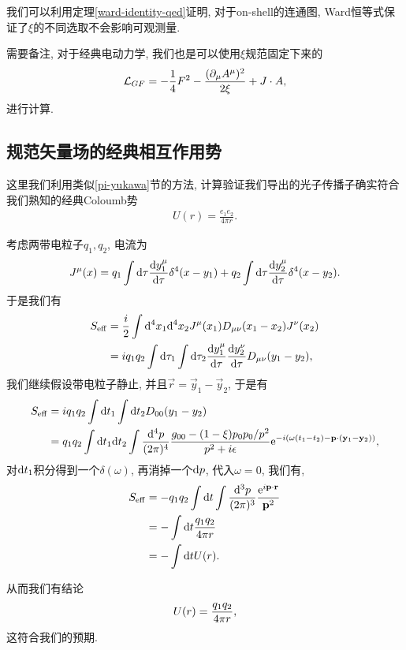 我们可以利用定理\ref{ward-identity-qed}证明, 对于on-shell的连通图, Ward恒等式保证了$\xi$的不同选取不会影响可观测量.

需要备注, 对于经典电动力学, 我们也是可以使用$\xi$规范固定下来的
\begin{align}
    \mathcal L_{GF}=-\frac14 F^2-\frac{(\partial_\mu A^\mu)^2}{2\xi}+J\cdot A\notag,
\end{align}
进行计算.

\subsection{规范矢量场的经典相互作用势}
这里我们利用类似\ref{pi-yukawa}节的方法, 计算验证我们导出的光子传播子确实符合我们熟知的经典Coloumb势
\begin{align}
    U(r)=\frac{e_1e_2}{4\pi r}.
\end{align}

考虑两带电粒子$q_1, q_2$, 电流为
\begin{align}
    J^\mu(x)=q_1\int\mathrm d\tau\frac{\mathrm dy_1^\mu}{\mathrm d\tau}\delta^4(x-y_1)+q_2\int\mathrm d\tau\frac{\mathrm dy_2^\mu}{\mathrm d\tau}\delta^4(x-y_2).
\end{align}
于是我们有
\begin{align}
    S_{\mathrm{eff}}&=\frac i2\int\mathrm d^4x_1\mathrm d^4x_2J^\mu(x_1)D_{\mu\nu}(x_1-x_2)J^\nu(x_2)\\
    &=iq_1q_2\int\mathrm d\tau_1\int\mathrm d\tau_2\frac{\mathrm dy_1^\mu}{\mathrm d\tau}\frac{\mathrm dy_2^\nu}{\mathrm d\tau}D_{\mu\nu}(y_1-y_2),
\end{align}
我们继续假设带电粒子静止, 并且$\vec r=\vec y_1-\vec y_2$, 于是有
\begin{align}
    S_{\mathrm{eff}}&=iq_1q_2\int\mathrm d t_1\int\mathrm d t_2 D_{00}(y_1-y_2)\\
    &=q_1q_2\int\mathrm d t_1\mathrm d t_2\int\frac{\mathrm d^4p}{(2\pi)^4}\frac{g_{00}-(1-\xi)p_0p_0/p^2}{p^2+i\epsilon}\mathrm e^{-i(\omega(t_1-t_2)-\mathbf{p}\cdot(\mathbf{y}_1-\mathbf{y}_2))},
\end{align}
对$\mathrm d t_1$积分得到一个$\delta(\omega)$, 再消掉一个$\mathrm d p$, 代入$\omega=0$, 我们有,
\begin{align}
    S_{\mathrm{eff}}&=-q_1q_2\int\mathrm d t\int\frac{\mathrm d^3p}{(2\pi)^3}\frac{\mathrm e^{i\mathbf{p}\cdot\mathbf{r}}}{\mathbf{p}^2}\\
    &=-\int\mathrm d t\frac{q_1q_2}{4\pi r}\\
    &=-\int\mathrm d t U(r).
\end{align}

从而我们有结论
\begin{align}
    U(r)=\frac{q_1q_2}{4\pi r}\notag,
\end{align}
这符合我们的预期.



